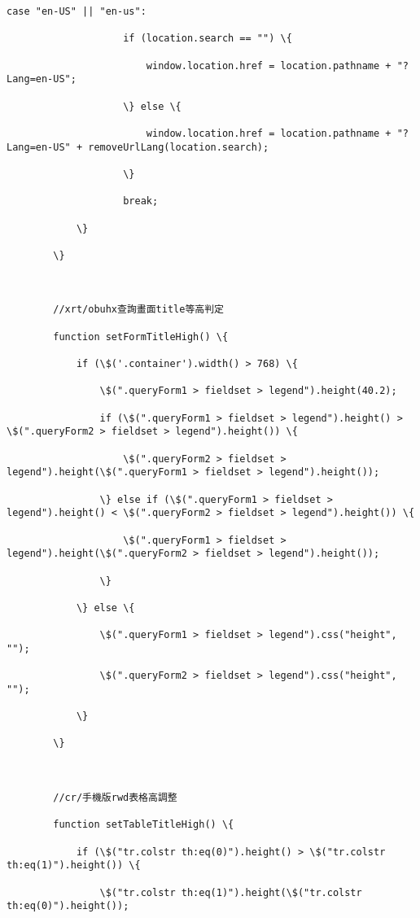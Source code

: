 \documentclass[11pt]{article}
\begin{document}
\begin{Verbatim}[commandchars=\\\{\}]
                case "en-US" || "en-us":

                    if (location.search == "") \{

                        window.location.href = location.pathname + "?Lang=en-US";

                    \} else \{

                        window.location.href = location.pathname + "?Lang=en-US" + removeUrlLang(location.search);

                    \}

                    break;

            \}

        \}



        //xrt/obuhx查詢畫面title等高判定

        function setFormTitleHigh() \{

            if (\$('.container').width() > 768) \{

                \$(".queryForm1 > fieldset > legend").height(40.2);

                if (\$(".queryForm1 > fieldset > legend").height() > \$(".queryForm2 > fieldset > legend").height()) \{

                    \$(".queryForm2 > fieldset > legend").height(\$(".queryForm1 > fieldset > legend").height());

                \} else if (\$(".queryForm1 > fieldset > legend").height() < \$(".queryForm2 > fieldset > legend").height()) \{

                    \$(".queryForm1 > fieldset > legend").height(\$(".queryForm2 > fieldset > legend").height());

                \}

            \} else \{

                \$(".queryForm1 > fieldset > legend").css("height", "");

                \$(".queryForm2 > fieldset > legend").css("height", "");

            \}

        \}



        //cr/手機版rwd表格高調整

        function setTableTitleHigh() \{

            if (\$("tr.colstr th:eq(0)").height() > \$("tr.colstr th:eq(1)").height()) \{

                \$("tr.colstr th:eq(1)").height(\$("tr.colstr th:eq(0)").height());


\end{Verbatim}
\end{document}
